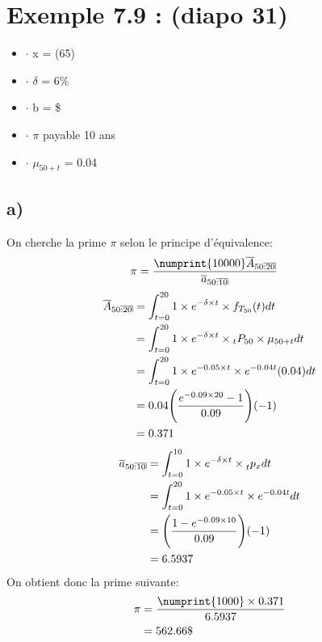 \documentclass[11pt,french]{report}
\makeatletter
\DeclareRobustCommand{\annuity}[1]{%
\def\arraystretch{0}%
\setlength\arraycolsep{.7pt}%
\setlength\arrayrulewidth{.3pt}%
\begin{array}[b]{@{}c|}\hline
\\[\arraycolsep]%
\scriptstyle #1%
\end{array}%
}
\newcommand{\indiceGauche}[2]{{\vphantom{#2}}_{#1}#2}
\makeatother
\begin{document}
\section{Exemple 7.9 : (diapo 31)}
\begin{itemize}
\item $ \cdot $ x = (65)
\item $ \cdot $ $\delta$ = 6\%
\item $ \cdot $ b = \$
\item $ \cdot $ $\pi$ payable 10 ans
\item $ \cdot $ $\mu_{50+t}$ = 0.04
\end{itemize}
\subsection*{a)}
On cherche la prime $\pi$ selon le principe d'équivalence:
\begin{align*}
\pi &= \frac{\numprint{10000} \overline{A}_{50\annuity{:20}}}{\overline{a}_{50\annuity{:10}}}
\end{align*}
\begin{align*}
\overline{A}_{50\annuity{:20}} &= \int_{t=0}^{20} 1 \times  e^{-\delta\times t}\times f_{T_{50}}(t)dt\\
&= \int_{t=0}^{20} 1 \times  e^{-\delta\times t}\times \indiceGauche{t}{P}_{50} \times  \mu_{50+t} dt\\
&= \int_{t=0}^{20} 1 \times  e^{-0.05\times t}\times  e^{-0.04t}(0.04) dt\\
&= 0.04 \Bigg(\frac{e^{-0.09\times 20} - 1}{0.09}\Bigg)(-1)\\
&=0.371
\end{align*}
\begin{align*}
\overline{a}_{50\annuity{:10}} &= \int_{t=0}^{10} 1 \times  e^{-\delta\times t}\times \indiceGauche{t}p_{x} dt\\
&= \int_{t=0}^{20} 1 \times  e^{-0.05\times t}\times  e^{-0.04t} dt\\
&= \Bigg(\frac{1 - e^{-0.09\times 10}}{0.09}\Bigg)(-1)\\
&=6.5937
\end{align*}
On obtient donc la prime suivante:
\begin{align*}
\pi &= \frac{\numprint{1000} \times  0.371}{6.5937} \\
&= 562.66 \$
\end{align*}
\end{document}
